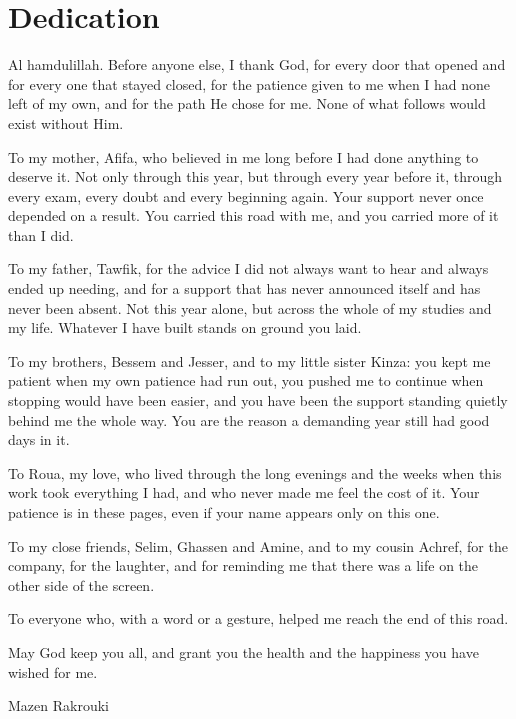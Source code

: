 \chapter*{\Huge Dedication}
\vspace{8mm}

{\itshape

Al hamdulillah. Before anyone else, I thank God, for every door that opened and for every one
that stayed closed, for the patience given to me when I had none left of my own, and for the path
He chose for me. None of what follows would exist without Him.

To my mother, Afifa, who believed in me long before I had done anything to deserve it. Not only
through this year, but through every year before it, through every exam, every doubt and every
beginning again. Your support never once depended on a result. You carried this road with me, and
you carried more of it than I did.

To my father, Tawfik, for the advice I did not always want to hear and always ended up needing,
and for a support that has never announced itself and has never been absent. Not this year alone,
but across the whole of my studies and my life. Whatever I have built stands on ground you laid.

To my brothers, Bessem and Jesser, and to my little sister Kinza: you kept me patient when my own
patience had run out, you pushed me to continue when stopping would have been easier, and you have
been the support standing quietly behind me the whole way. You are the reason a demanding year
still had good days in it.

To Roua, my love, who lived through the long evenings and the weeks when this work took everything
I had, and who never made me feel the cost of it. Your patience is in these pages, even if your
name appears only on this one.

To my close friends, Selim, Ghassen and Amine, and to my cousin Achref, for the company, for the
laughter, and for reminding me that there was a life on the other side of the screen.

To everyone who, with a word or a gesture, helped me reach the end of this road.

\vspace{7mm}
\begin{flushright}
May God keep you all, and grant you the health and the happiness you have wished for me.
\end{flushright}

\vspace{9mm}
\begin{flushright}
{\Large Mazen Rakrouki}
\end{flushright}

}
